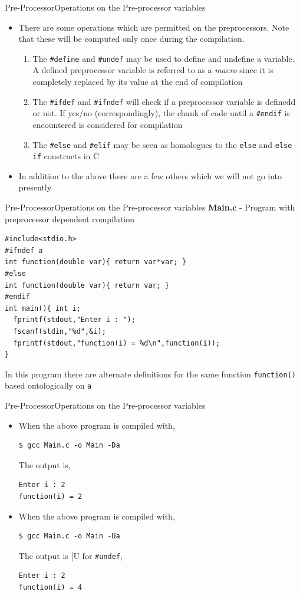 \documentclass{beamer}
\begin{document}
\begin{frame}[fragile]{Pre-Processor}{Operations on the Pre-processor variables}
\begin{itemize}
\item There are some operations which are permitted on the preprocessors. \alert{Note that these will be computed only once during the compilation}.
\begin{enumerate}
\item The \verb|#define| and \verb|#undef| may be used to define and undefine a variable. A defined preprocessor variable is referred to as a \emph{macro} since it is completely replaced by its value at the end of compilation
\item The \verb|#ifdef| and \verb|#ifndef| will check if a preprocessor variable is definedd or not. If yes/no (correspondingly), the chunk of code until a \verb|#endif| is encountered is considered for compilation
\item The \verb|#else| and \verb|#elif| may be seen as homologues to the \verb|else| and \verb|else if| constructs in C
\end{enumerate}
\item In addition to the above there are a few others which we will not go into presently
\end{itemize}
\end{frame}

\begin{frame}[fragile]{Pre-Processor}{Operations on the Pre-processor variables}
\textbf{Main.c} - Program with preprocessor dependent compilation
\begin{verbatim}
#include<stdio.h>
#ifndef a
int function(double var){ return var*var; }
#else
int function(double var){ return var; }
#endif
int main(){ int i;
  fprintf(stdout,"Enter i : ");
  fscanf(stdin,"%d",&i);
  fprintf(stdout,"function(i) = %d\n",function(i));
}
\end{verbatim}
In this program there are alternate definitions for the same function \verb|function()| based ontologically on \verb|a|
\end{frame}

\begin{frame}[fragile]{Pre-Processor}{Operations on the Pre-processor variables}
\begin{itemize}
\item When the above program is compiled with,
\begin{verbatim}
$ gcc Main.c -o Main -Da
\end{verbatim}
The output is,
\begin{verbatim}
Enter i : 2
function(i) = 2
\end{verbatim}
\item When the above program is compiled with,
\begin{verbatim}
$ gcc Main.c -o Main -Ua
\end{verbatim}
The output is [U for \verb|#undef|,
\begin{verbatim}
Enter i : 2
function(i) = 4
\end{verbatim}
\end{itemize}
\end{frame}
\end{document}
